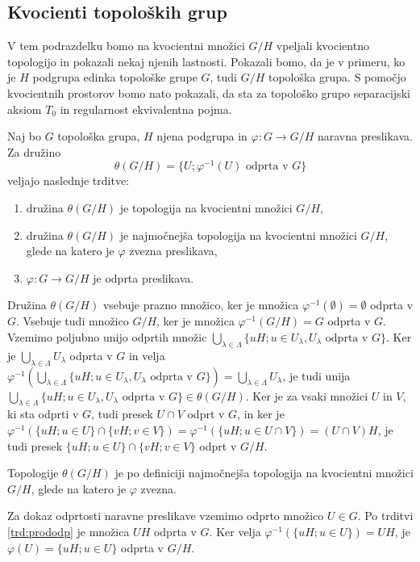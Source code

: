 \documentclass[mat1]{fmfdelo}
\begin{document}
\subsection{Kvocienti topoloških grup}
V tem podrazdelku bomo na kvocientni množici $G/H$ vpeljali kvocientno topologijo in pokazali nekaj njenih lastnosti. Pokazali bomo, da je v primeru, ko je $H$ podgrupa edinka topološke grupe $G$, tudi $G/H$ topološka grupa. S pomočjo kvocientnih prostorov bomo nato pokazali, da sta za topološko grupo separacijski aksiom $T_0$ in regularnost ekvivalentna pojma.

\begin{izrek}\label{izr:topkvocienta}
Naj bo $G$ topološka grupa, $H$ njena podgrupa in $\varphi\colon G \to G/H$ naravna preslikava. Za družino \[\theta(G/H) = \lbrace U ; \varphi^{-1}(U) \text{ odprta v } G \rbrace\]
veljajo naslednje trditve:
\begin{enumerate}
\item družina $\theta(G/H)$ je topologija na kvocientni množici $G/H$,
\item družina $\theta(G/H)$ je najmočnejša topologija na kvocientni množici $G/H$, glede na katero je $\varphi$ zvezna preslikava,
\item $\varphi: G \to G/H$ je odprta preslikava.
\end{enumerate}
\end{izrek}

\begin{dokaz}
Družina $\theta(G/H)$ vsebuje prazno množico, ker je množica $\varphi^{-1}(\emptyset) = \emptyset$ odprta v $G$. Vsebuje tudi množico $G/H$, ker je množica $\varphi^{-1}(G/H) = G$ odprta v $G$. Vzemimo poljubno unijo odprtih množic $\bigcup_{\lambda \in \Lambda}\lbrace uH ; u \in U_\lambda, U_\lambda \text{ odprta v } G\rbrace$. Ker je $\bigcup_{\lambda \in \Lambda} U_\lambda$ odprta v $G$ in velja $\varphi^{-1}(\bigcup_{\lambda \in \Lambda}\lbrace uH ; u \in U_\lambda, U_\lambda \text{ odprta v } G\rbrace) = \bigcup_{\lambda \in \Lambda} U_\lambda$, je tudi unija $\bigcup_{\lambda \in \Lambda}\lbrace uH ; u \in U_\lambda, U_\lambda \text{ odprta v } G\rbrace \in \theta(G/H)$. Ker je za vsaki množici $U$ in $V$, ki sta odprti v $G$, tudi presek $U \cap V$ odprt v $G$, in ker je $\varphi^{-1}(\lbrace uH ; u \in U\rbrace \cap \lbrace vH ; v \in V \rbrace) = \varphi^{-1}(\lbrace uH ; u \in U \cap V \rbrace) = (U \cap V)H$, je tudi presek $\lbrace uH ; u \in U\rbrace \cap \lbrace vH ; v \in V \rbrace$ odprt v $G/H$.

Topologije $\theta(G/H)$ je po definiciji najmočnejša topologija na kvocientni množici $G/H$, glede na katero je $\varphi$ zvezna.

Za dokaz odprtosti naravne preslikave vzemimo odprto množico $U \in G$. Po trditvi \ref{trd:prododp} je množica $UH$ odprta v $G$. Ker velja $\varphi^{-1}(\lbrace uH ; u \in U \rbrace) = UH$, je $\varphi(U) = \lbrace uH ; u \in U \rbrace$ odprta v $G/H$.
\end{dokaz}
\end{document}
